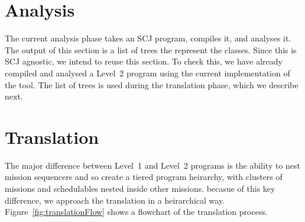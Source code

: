 \documentclass[10pt,a4paper]{article}
\begin{document}



\section{Analysis}

The current analysis phase takes an SCJ program, compiles it, and analyses it. The output of this section is a list of trees the represent the classes. Since this is SCJ agnostic, we intend to reuse this section. To check this, we have already compiled and analysed a Level~2 program using the current implementation of the tool. The list of trees is used during the translation phase, which we describe next.

\section{Translation}

The major difference between Level~1 and Level~2 programs is the ability to nest mission sequencers and so create a tiered program heirarchy, with clusters of missions and schedulables nested inside other missions. becasue of this key difference, we approach the translation in a heirarchical way. Figure~\ref{fig:translationFlow} shows a flowchart of the translation process. 
\end{document}

